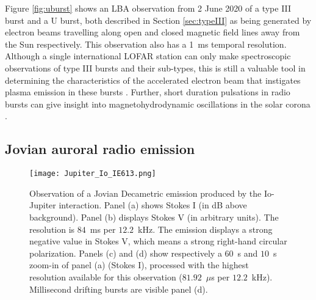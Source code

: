 Figure \ref{fig:uburst} shows an LBA observation from 2 June 2020 of a type III burst and a U burst, both described in Section \ref{sec:typeIII} as being generated by electron beams travelling along open and closed magnetic field lines away from the Sun respectively. This observation also has a 1~ms temporal resolution. Although a single international LOFAR station can only make spectroscopic observations of type III bursts and their sub-types, this is still a valuable tool in determining the characteristics of the accelerated electron beam that instigates plasma emission in these bursts \citep{Reid2018}. Further, short duration pulsations in radio bursts can give insight into magnetohydrodynamic oscillations in the solar corona \citep{Carley2019}.

\subsection{Jovian auroral radio emission}

\begin{figure*}
    \centering
        \texttt{[image: Jupiter\_Io\_IE613.png]}              
    \caption[Observation of a Jovian Decametric emission produced by the Io-Jupiter interaction.]{Observation of a Jovian Decametric emission produced by the Io-Jupiter interaction. Panel (a) shows Stokes I (in dB above background). Panel (b) displays Stokes V (in arbitrary units). The resolution is $84$~ms per $12.2$~kHz. The emission displays a strong negative value in Stokes V, which means a strong right-hand circular polarization. Panels (c) and (d) show respectively a $60$~s and $10$~s zoom-in of panel (a) (Stokes I), processed with the highest resolution available for this observation ($81.92$~$\mu$s per $12.2$~kHz). Millisecond drifting bursts are visible panel (d).}
    \label{fig:io-stokesI}
\end{figure*}


